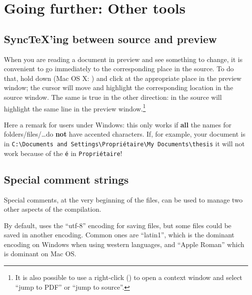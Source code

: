 
\chapter{Going further: Other tools}

\section{SyncTeX'ing between source and preview}
\label{sec.synctex}

When you are reading a document in preview and see something to change, it is convenient to go immediately to the corresponding place in the source. To do that, hold down  (Mac OS X: ) and click at the appropriate place in the preview window; the cursor will move and highlight the corresponding location in the source window. The same is true in the other direction:  in the source will highlight the same line in the preview window.\footnote{It is also possible to use a right-click () to open a context window and select ``jump to PDF'' or ``jump to source''.}

\begin{OSWindows}
Here a remark for users under Windows: this only works if \textbf{all} the names for folders/files/\dots do \textbf{not} have accented characters. If, for example, your document is in \texttt{C:{\textbackslash}Documents and Settings{\textbackslash}Propriétaire{\textbackslash}My Documents{\textbackslash}thesis} it will not work because of the \verb|é| in \texttt{Propriétaire}!
\end{OSWindows}

\section{Special comment strings}

Special comments, at the very beginning of the files, can be used to manage two other aspects of the compilation.

By default, {\Tw} uses the ``utf-8'' encoding for saving files, but some files could be saved in another encoding. Common ones are ``latin1'', which is the dominant encoding on Windows when using western languages, and ``Apple Roman'' which is dominant on Mac OS.

